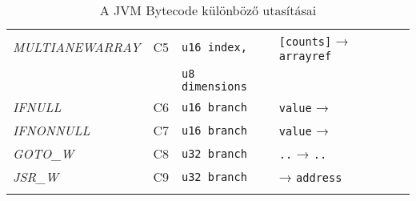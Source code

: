 \begin{center}
\begin{longtable}{ | p{} | p{} | p{} | p{} | }
        \emph{MULTIANEWARRAY}
		& C5 & \lstinline|u16 index, | & \lstinline|[counts]| → \lstinline|arrayref| \\
        & & \lstinline|u8 dimensions| & 
		\\ \hline

        \emph{IFNULL}
		& C6 & \lstinline|u16 branch| & \lstinline|value| →
		\\ \hline

        \emph{IFNONNULL}
		& C7 & \lstinline|u16 branch| & \lstinline|value| →
		\\ \hline

        \emph{GOTO\_W}
		& C8 & \lstinline|u32 branch| & \lstinline|..| → \lstinline|..|
		\\ \hline
        
        \emph{JSR\_W}
		& C9 & \lstinline|u32 branch| & → \lstinline|address|
		\\ \hline
		
		\caption{A JVM Bytecode különböző utasításai}
		\label{tab:example-3}		
	\end{longtable}
\end{center}